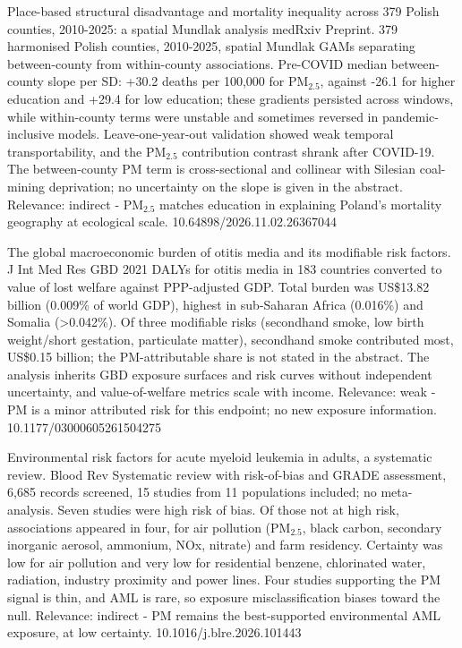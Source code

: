 \documentclass[10pt]{article}
\begin{document}
{Place-based structural disadvantage and mortality inequality across 379 Polish counties, 2010-2025: a spatial Mundlak analysis}
{medRxiv}
{Preprint. 379 harmonised Polish counties, 2010-2025, spatial Mundlak GAMs separating between-county from within-county associations. Pre-COVID median between-county slope per SD: +30.2 deaths per 100,000 for PM$_{2.5}$, against -26.1 for higher education and +29.4 for low education; these gradients persisted across windows, while within-county terms were unstable and sometimes reversed in pandemic-inclusive models. Leave-one-year-out validation showed weak temporal transportability, and the PM$_{2.5}$ contribution contrast shrank after COVID-19. The between-county PM term is cross-sectional and collinear with Silesian coal-mining deprivation; no uncertainty on the slope is given in the abstract. Relevance: indirect - PM$_{2.5}$ matches education in explaining Poland's mortality geography at ecological scale.}
{10.64898/2026.11.02.26367044}

{The global macroeconomic burden of otitis media and its modifiable risk factors.}
{J Int Med Res}
{GBD 2021 DALYs for otitis media in 183 countries converted to value of lost welfare against PPP-adjusted GDP. Total burden was US\$13.82 billion (0.009\% of world GDP), highest in sub-Saharan Africa (0.016\%) and Somalia (>0.042\%). Of three modifiable risks (secondhand smoke, low birth weight/short gestation, particulate matter), secondhand smoke contributed most, US\$0.15 billion; the PM-attributable share is not stated in the abstract. The analysis inherits GBD exposure surfaces and risk curves without independent uncertainty, and value-of-welfare metrics scale with income. Relevance: weak - PM is a minor attributed risk for this endpoint; no new exposure information.}
{10.1177/03000605261504275}

\par{}\baselineskip{}\baselineskip
{}

{Environmental risk factors for acute myeloid leukemia in adults, a systematic review.}
{Blood Rev}
{Systematic review with risk-of-bias and GRADE assessment, 6,685 records screened, 15 studies from 11 populations included; no meta-analysis. Seven studies were high risk of bias. Of those not at high risk, associations appeared in four, for air pollution (PM$_{2.5}$, black carbon, secondary inorganic aerosol, ammonium, NOx, nitrate) and farm residency. Certainty was low for air pollution and very low for residential benzene, chlorinated water, radiation, industry proximity and power lines. Four studies supporting the PM signal is thin, and AML is rare, so exposure misclassification biases toward the null. Relevance: indirect - PM remains the best-supported environmental AML exposure, at low certainty.}
{10.1016/j.blre.2026.101443}
\end{document}
